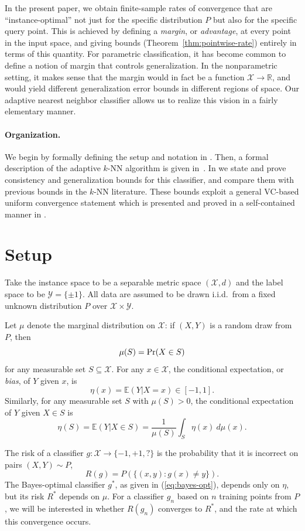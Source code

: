 \documentclass{article}
\def\R{{\mathbb{R}}}
\def\pr{{\rm Pr}}
\def\E{{\mathbb E}}
\def\X{{\mathcal X}}
\def\Y{{\mathcal Y}}
\newcommand{\new}[1]{\color{red} #1}
\begin{document}
In the present paper, we obtain finite-sample rates of convergence that are ``instance-optimal'' not just for the specific distribution $P$ but also for the specific query point. This is achieved by defining a {\it margin}, or {\it advantage}, at every point in the input space, and giving bounds (Theorem~\ref{thm:pointwise-rate}) entirely in terms of this quantity. For parametric classification, it has become common to define a notion of margin that controls generalization. In the nonparametric setting, it makes sense that the margin would in fact be a function $\X \rightarrow \R$, and would yield different generalization error bounds in different regions of space. Our adaptive nearest neighbor classifier allows us to realize this vision in a fairly elementary manner.

\paragraph{Organization.} 
{\new{We begin by formally defining the setup and notation in \Cref{sec:setup}.
Then, a formal description of the adaptive $k$-NN algorithm is given in~\Cref{sec:alg}.
In \Cref{sec:gen1,sec:gen2,sec:gen3} we state and prove consistency and generalization
bounds for this classifier, and compare them with previous bounds in the $k$-NN literature.
These bounds exploit a general VC-based uniform convergence statement
which is presented and proved in a self-contained manner in \Cref{sec:ucecm}.}}


\section{Setup}\label{sec:setup}

Take the instance space to be a separable metric space $(\X, d)$ and the label space to be $\Y = \{\pm 1\}$. All data are assumed to be drawn i.i.d.\ from a fixed unknown distribution $P$ over $\X \times \Y$.

Let $\mu$ denote the marginal distribution on $\X$: if $(X,Y)$ is a 
random draw from $P$, then
$$ \mu(S) = \pr(X \in S)$$
for any measurable set $S \subseteq \X$. For any $x \in \X$, the conditional expectation, or {\em bias}, of $Y$ given $x$, is
$$ \eta(x) = \E(Y| X = x) \in [-1,1] .$$ 
Similarly, for any measurable set $S$ with $\mu(S) > 0$, the
conditional expectation of $Y$ given $X \in S$ is
$$ \eta(S) = \E(Y| X \in S) = \frac{1}{\mu(S)} \int_S \eta(x) \ d \mu(x) .$$

The risk of a classifier $g: \X \rightarrow \{-1,+1,?\}$ is the probability that it is incorrect on pairs $(X,Y) \sim P$,
\begin{equation}
R(g) = P(\{(x,y): g(x) \neq y\}).
\label{eq:risk}
\end{equation}
The Bayes-optimal classifier $g^*$, as given in (\ref{eq:bayes-opt}), depends only on $\eta$, but its risk $R^*$ depends on $\mu$. For a classifier $g_n$ based on $n$ training points from $P$, we will be interested in whether $R(g_n)$ converges to $R^*$, and the rate at which this convergence occurs.
\end{document}

